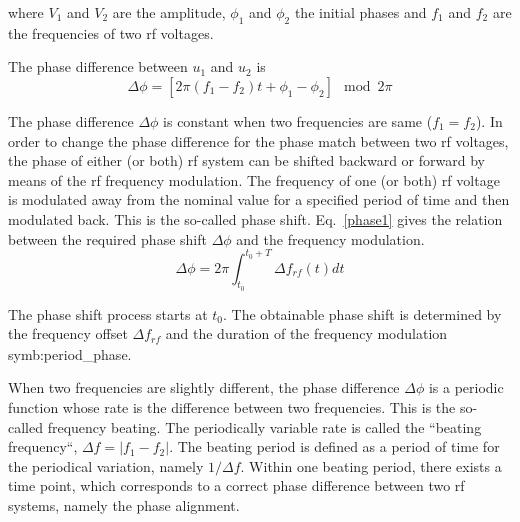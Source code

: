 where $V_1$ and $V_2$ are the amplitude, $\phi_1$ and $\phi_2$ the initial phases and $f_1$ and $f_2$ are the frequencies of two rf voltages. 


The phase difference between $u_1$ and $u_2$ is
\begin{equation}
	\Delta \phi=[2\pi(f_1-f_2)t+\phi_1-\phi_2] \mod 2\pi\label{phase_diff_general}
\end{equation}

The phase difference $\Delta \phi$ is constant when two frequencies are same ($f_1=f_2$). In order to change the phase difference for the phase match between two rf voltages, the phase of either (or both) rf system can be shifted backward or forward by means of the rf frequency modulation. The frequency of one (or both) rf voltage is modulated away from the nominal value for a specified period of time and then modulated back. This is the so-called phase shift. Eq.~\ref{phase1} gives the relation between the required phase shift $\Delta \phi$ and the frequency modulation. 
\begin{equation}
\Delta \phi= 2\pi \int_{t_0}^{t_0+T} \Delta f_\mathit{rf}(t)dt \label{phase1}
\end{equation}

The phase shift process starts at $t_0$. The obtainable phase shift is determined by the frequency offset $\Delta f_\mathit{rf}$ and the duration of the frequency modulation \gls{symb:period_phase}. 

When two frequencies are slightly different, the phase difference $\Delta \phi$ is a periodic function whose rate is the difference between two frequencies. This is the so-called frequency beating. The periodically variable rate is called the ``beating frequency``, $\Delta f=|f_1-f_2|$. The beating period is defined as a period of time for the periodical variation, namely $1/\Delta f$. Within one beating period, there exists a time point, which corresponds to a correct phase difference between two rf systems, namely the phase alignment. 

